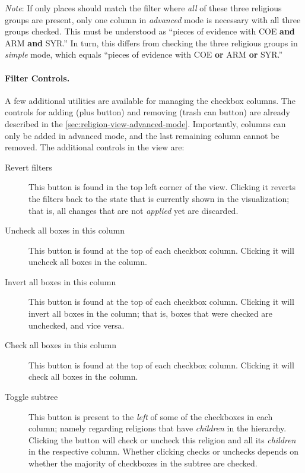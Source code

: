 \emph{Note}: If only places should match the filter where \emph{all} of these three religious groups are present, only one column in \emph{advanced} mode is necessary with all three groups checked.
This must be understood as \enquote{pieces of evidence with COE \textbf{and} ARM \textbf{and} SYR.}
In turn, this differs from checking the three religious groups in \emph{simple} mode, which equals \enquote{pieces of evidence with COE \textbf{or} ARM \textbf{or} SYR.}

\paragraph{Filter Controls.}
A few additional utilities are available for managing the checkbox columns.
The controls for adding (plus button) and removing (trash can button) are already described in the \cref{sec:religion-view-advanced-mode}.
Importantly, columns can only be added in advanced mode, and the last remaining column cannot be removed.
The additional controls in the view are:

\begin{description}
  \item[Revert filters]
    This button is found in the top left corner of the view.
    Clicking it reverts the filters back to the state that is currently shown in the visualization;
    that is, all changes that are not \emph{applied} yet are discarded.
  \item[Uncheck all boxes in this column]
    This button is found at the top of each checkbox column.
    Clicking it will uncheck all boxes in the column.
  \item[Invert all boxes in this column]
    This button is found at the top of each checkbox column.
    Clicking it will invert all boxes in the column;
    that is, boxes that were checked are unchecked, and vice versa.
  \item[Check all boxes in this column]
    This button is found at the top of each checkbox column.
    Clicking it will check all boxes in the column.
  \item[Toggle subtree]
    This button is present to the \emph{left} of some of the checkboxes in each column;
    namely regarding religions that have \emph{children} in the hierarchy.
    Clicking the button will check or uncheck this religion and all its \emph{children} in the respective column.
    Whether clicking checks or unchecks depends on whether the majority of checkboxes in the subtree are checked.
\end{description}


